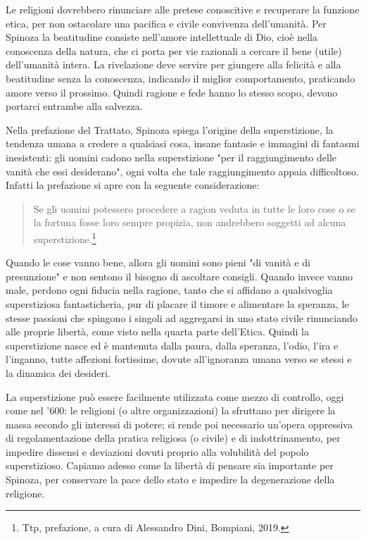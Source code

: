 Le religioni dovrebbero rinunciare alle pretese conoscitive e recuperare la funzione etica, per non ostacolare una pacifica e civile convivenza dell'umanità. Per Spinoza la beatitudine consiste nell'amore intellettuale di Dio, cioè nella conoscenza della natura, che ci porta per vie razionali a cercare il bene (utile) dell'umanità intera. La rivelazione deve servire per giungere alla felicità e alla beatitudine senza la conoscenza, indicando il miglior comportamento, praticando amore verso il prossimo. Quindi ragione e fede hanno lo stesso scopo, devono portarci entrambe alla salvezza.

Nella prefazione del Trattato, Spinoza spiega l'origine della superstizione, la tendenza umana a credere a qualsiasi cosa, insane fantasie e immagini di fantasmi inesistenti: gli uomini cadono nella superstizione "per il raggiungimento delle vanità che essi
desiderano", ogni volta che tale raggiungimento appaia difficoltoso. Infatti la prefazione si
apre con la seguente considerazione: 

\begin{quotation}
	\small Se gli uomini potessero procedere a ragion veduta in tutte le
	loro cose o se la fortuna fosse loro sempre propizia, non andrebbero soggetti ad alcuna
	superstizione.\footnote{Ttp, prefazione, a cura di Alessandro Dini, Bompiani, 2019.}
\end{quotation}

Quando le cose vanno bene, allora gli uomini sono pieni "di vanità e di
presunzione" e non sentono il bisogno di ascoltare consigli. Quando invece vanno
male, perdono ogni fiducia nella ragione, tanto che si affidano a qualsivoglia
superstiziosa fantasticheria, pur di placare il timore e alimentare la speranza, le stesse passioni che spingono i singoli ad aggregarsi in uno stato civile rinunciando alle proprie libertà, come visto nella quarta parte dell'Etica. Quindi la superstizione nasce ed è mantenuta dalla paura, dalla speranza, l'odio, l'ira e l'inganno, tutte affezioni fortissime, dovute all'ignoranza umana verso se stessi e la dinamica dei desideri.

La superstizione può essere facilmente utilizzata come mezzo di controllo, oggi come nel '600: le religioni (o altre organizzazioni) la sfruttano per dirigere la massa secondo gli interessi di potere; si rende poi necessario un'opera oppressiva di regolamentazione della pratica religiosa (o civile) e di indottrinamento, per impedire dissensi e deviazioni dovuti proprio alla volubilità del popolo superstizioso. Capiamo adesso come la libertà di pensare sia importante per Spinoza, per conservare la pace dello stato e impedire la degenerazione della religione.

